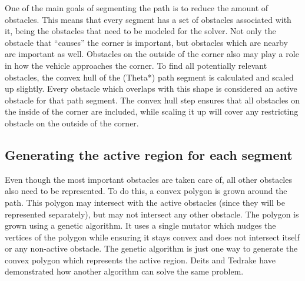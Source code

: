 One of the main goals of segmenting the path is to reduce the amount of obstacles. This means that every segment has a set of obstacles associated with it, being the obstacles that need to be modeled for the solver. Not only the obstacle that ``causes'' the corner is important, but obstacles which are nearby are important as well. Obstacles on the outside of the corner also may play a role in how the vehicle approaches the corner. To find all potentially relevant obstacles, the convex hull of the (Theta*) path segment is calculated and scaled up slightly. Every obstacle which overlaps with this shape is considered an active obstacle for that path segment. The convex hull step ensures that all obstacles on the inside of the corner are included, while scaling it up will cover any restricting obstacle on the outside of the corner.
\subsection{Generating the active region for each segment}
Even though the most important obstacles are taken care of, all other obstacles also need to be represented. To do this, a convex polygon is grown around the path. This polygon may intersect with the active obstacles (since they will be represented separately), but may not intersect any other obstacle. The polygon is grown using a genetic algorithm. It uses a single mutator which nudges the vertices of the polygon while ensuring it stays convex and does not intersect itself or any non-active obstacle. The genetic algorithm is just one way to generate the convex polygon which represents the active region. Deits and Tedrake \cite{Deits2015} have demonstrated how another algorithm can solve the same problem.

